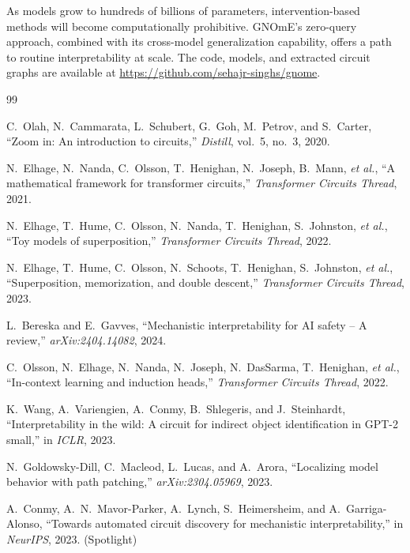 \documentclass[11pt,a4paper]{article}
\begin{document}
As models grow to hundreds of billions of parameters, intervention-based methods will become computationally prohibitive. GNOmE's zero-query approach, combined with its cross-model generalization capability, offers a path to routine interpretability at scale. The code, models, and extracted circuit graphs are available at \url{https://github.com/sehajr-singhs/gnome}.

\begin{thebibliography}{99}

C.~Olah, N.~Cammarata, L.~Schubert, G.~Goh, M.~Petrov, and S.~Carter,
``Zoom in: An introduction to circuits,''
\textit{Distill}, vol.~5, no.~3, 2020.

N.~Elhage, N.~Nanda, C.~Olsson, T.~Henighan, N.~Joseph, B.~Mann, \emph{et al.},
``A mathematical framework for transformer circuits,''
\textit{Transformer Circuits Thread}, 2021.

N.~Elhage, T.~Hume, C.~Olsson, N.~Nanda, T.~Henighan, S.~Johnston, \emph{et al.},
``Toy models of superposition,''
\textit{Transformer Circuits Thread}, 2022.

N.~Elhage, T.~Hume, C.~Olsson, N.~Schoots, T.~Henighan, S.~Johnston, \emph{et al.},
``Superposition, memorization, and double descent,''
\textit{Transformer Circuits Thread}, 2023.

L.~Bereska and E.~Gavves,
``Mechanistic interpretability for AI safety -- A review,''
\textit{arXiv:2404.14082}, 2024.

C.~Olsson, N.~Elhage, N.~Nanda, N.~Joseph, N.~DasSarma, T.~Henighan, \emph{et al.},
``In-context learning and induction heads,''
\textit{Transformer Circuits Thread}, 2022.

K.~Wang, A.~Variengien, A.~Conmy, B.~Shlegeris, and J.~Steinhardt,
``Interpretability in the wild: A circuit for indirect object identification in GPT-2 small,''
in \textit{ICLR}, 2023.

N.~Goldowsky-Dill, C.~Macleod, L.~Lucas, and A.~Arora,
``Localizing model behavior with path patching,''
\textit{arXiv:2304.05969}, 2023.

A.~Conmy, A.~N.~Mavor-Parker, A.~Lynch, S.~Heimersheim, and A.~Garriga-Alonso,
``Towards automated circuit discovery for mechanistic interpretability,''
in \textit{NeurIPS}, 2023. (Spotlight)


\end{thebibliography}
\end{document}
